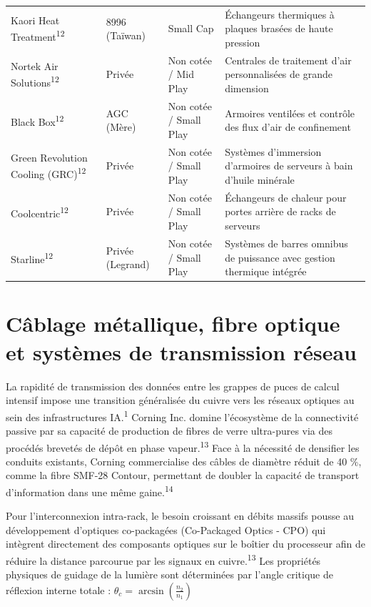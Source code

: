 \documentclass[11pt,a4paper]{article}
\begin{document}
\begin{longtable}{p{3cm} p{3.5cm} p{3cm} p{5cm}}
Kaori Heat Treatment\textsuperscript{12} & 8996 (Taïwan) & Small Cap & Échangeurs thermiques à plaques brasées de haute pression \\
Nortek Air Solutions\textsuperscript{12} & Privée & Non cotée / Mid Play & Centrales de traitement d'air personnalisées de grande dimension \\
Black Box\textsuperscript{12} & AGC (Mère) & Non cotée / Small Play & Armoires ventilées et contrôle des flux d'air de confinement \\
Green Revolution Cooling (GRC)\textsuperscript{12} & Privée & Non cotée / Small Play & Systèmes d'immersion d'armoires de serveurs à bain d'huile minérale \\
Coolcentric\textsuperscript{12} & Privée & Non cotée / Small Play & Échangeurs de chaleur pour portes arrière de racks de serveurs \\
Starline\textsuperscript{12} & Privée (Legrand) & Non cotée / Small Play & Systèmes de barres omnibus de puissance avec gestion thermique intégrée \\
\bottomrule
\end{longtable}

\section*{Câblage métallique, fibre optique et systèmes de transmission réseau}

La rapidité de transmission des données entre les grappes de puces de calcul intensif impose une transition généralisée du cuivre vers les réseaux optiques au sein des infrastructures IA.\textsuperscript{1} Corning Inc. domine l'écosystème de la connectivité passive par sa capacité de production de fibres de verre ultra-pures via des procédés brevetés de dépôt en phase vapeur.\textsuperscript{13} Face à la nécessité de densifier les conduits existants, Corning commercialise des câbles de diamètre réduit de 40 \%, comme la fibre SMF-28 Contour, permettant de doubler la capacité de transport d'information dans une même gaine.\textsuperscript{14}

Pour l'interconnexion intra-rack, le besoin croissant en débits massifs pousse au développement d'optiques co-packagées (Co-Packaged Optics - CPO) qui intègrent directement des composants optiques sur le boîtier du processeur afin de réduire la distance parcourue par les signaux en cuivre.\textsuperscript{13} Les propriétés physiques de guidage de la lumière sont déterminées par l'angle critique de réflexion interne totale :
$\theta_c = \arcsin\left(\frac{n_2}{n_1}\right)$
\end{document}
